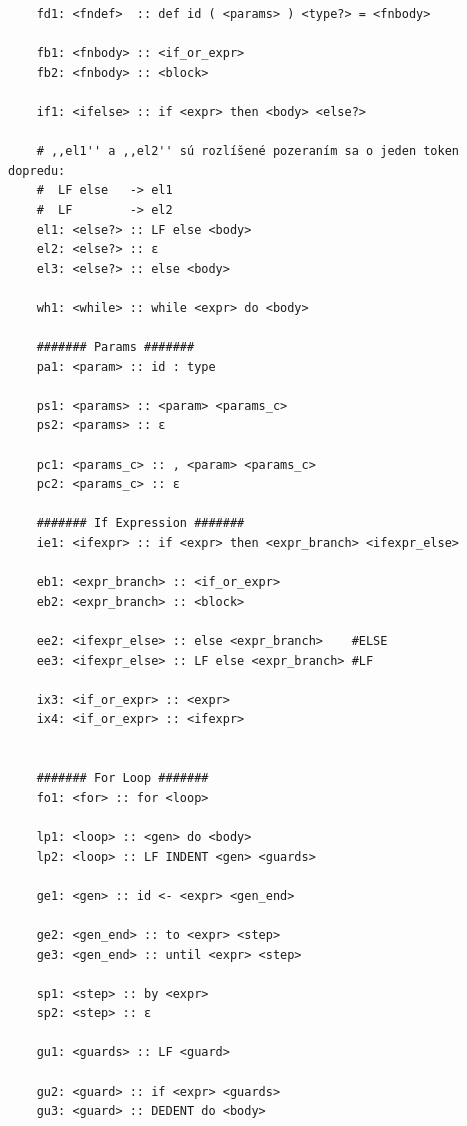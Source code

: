 \documentclass[11pt,a4paper]{article}
\begin{document}
\begin{verbatim}
    fd1: <fndef>  :: def id ( <params> ) <type?> = <fnbody>

    fb1: <fnbody> :: <if_or_expr>
    fb2: <fnbody> :: <block>

    if1: <ifelse> :: if <expr> then <body> <else?>

    # ,,el1'' a ,,el2'' sú rozlíšené pozeraním sa o jeden token dopredu:
    #  LF else   -> el1
    #  LF        -> el2
    el1: <else?> :: LF else <body>
    el2: <else?> :: ε
    el3: <else?> :: else <body>

    wh1: <while> :: while <expr> do <body>

    ####### Params #######
    pa1: <param> :: id : type

    ps1: <params> :: <param> <params_c>
    ps2: <params> :: ε

    pc1: <params_c> :: , <param> <params_c>
    pc2: <params_c> :: ε

    ####### If Expression #######
    ie1: <ifexpr> :: if <expr> then <expr_branch> <ifexpr_else>

    eb1: <expr_branch> :: <if_or_expr>
    eb2: <expr_branch> :: <block>

    ee2: <ifexpr_else> :: else <expr_branch>    #ELSE
    ee3: <ifexpr_else> :: LF else <expr_branch> #LF
    
    ix3: <if_or_expr> :: <expr>
    ix4: <if_or_expr> :: <ifexpr>
    
    
    ####### For Loop #######
    fo1: <for> :: for <loop>

    lp1: <loop> :: <gen> do <body>
    lp2: <loop> :: LF INDENT <gen> <guards> 

    ge1: <gen> :: id <- <expr> <gen_end>

    ge2: <gen_end> :: to <expr> <step>
    ge3: <gen_end> :: until <expr> <step>

    sp1: <step> :: by <expr>
    sp2: <step> :: ε
    
    gu1: <guards> :: LF <guard>

    gu2: <guard> :: if <expr> <guards>
    gu3: <guard> :: DEDENT do <body>


  \end{verbatim}
\end{document}
